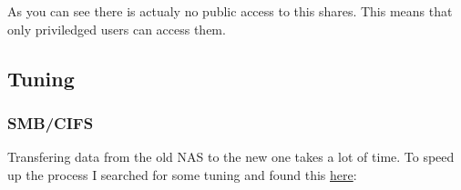 

As you can see there is actualy no public access to this shares. This means
that only priviledged users can access them.

\subsection{Tuning}

\subsubsection{SMB/CIFS}

Transfering data from the old \gls{NAS} to the new one takes a lot of time. To
speed up the process I searched for some tuning and found this
\href{https://techie-show.com/open-media-vault-smb-performance-quick-win/}{here}:

